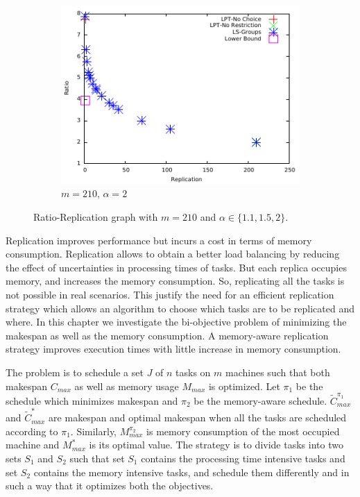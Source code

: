\documentclass[12pt]{article}
\theoremstyle{mystyle}
\begin{document}
\begin {figure}
       \begin{subfigure}[b]{0.5\textwidth}
         \includegraphics[width=\textwidth]{alpha_2.pdf}
         \caption{$m=210$, $\alpha=2$}
         \label{fig:3}
       \end{subfigure} %
     
       \caption{Ratio-Replication graph with $m=210$ and $\alpha \in \{1.1, 1.5, 2\}$.}
       \label{fig:Graph}
     \end{figure}
   
   \label{ch5}
   
   
    Replication improves performance but incurs a cost in terms of memory consumption.  
    Replication allows to obtain a better load balancing by reducing the effect of 
    uncertainties in processing times of tasks. But each replica occupies memory, and increases the memory consumption. 
    So, replicating all the tasks is not possible in real scenarios. This justify the need for an efficient replication 
    strategy which allows an algorithm to choose which tasks are to be replicated and where.
    In this chapter we investigate the bi-objective problem of minimizing the makespan as well as the memory consumption. A memory-aware replication strategy improves execution times with little increase in memory consumption. 
   
    The problem is to schedule a set $J$ of $n$ tasks on $m$ machines such that both makespan $C_{max}$ as well as memory usage $M_{max}$ is optimized.  
     Let $\pi_1$ be the schedule  which minimizes makespan and $\pi_2$ be the memory-aware schedule. $\tilde{C}^{\pi_1}_{max}$ and $\tilde{C}^{*}_{max}$ are makespan and optimal makespan when all the tasks are scheduled according to $\pi_1$. Similarly, $M^{\pi_2}_{max}$ is  memory consumption of the most  occupied machine and $M^*_{max}$ is its optimal value. The strategy is to divide tasks into two sets $S_1$ and $S_2$ such that set $S_1$ contains the processing time intensive tasks and set $S_2$ contains the memory intensive tasks, and schedule them differently and in such a way that it optimizes both the objectives. 
     
\end{document}
